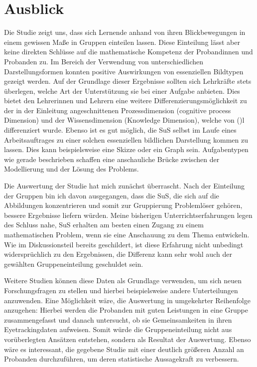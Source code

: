 \chapter{Ausblick}
Die Studie zeigt uns, dass sich Lernende anhand von ihren Blickbewegungen in einem gewissen Maße in Gruppen einteilen lassen. Diese Einteilung lässt aber keine direkten Schlüsse auf die mathematische Kompetenz der Probandinnen und Probanden zu.  Im Bereich der Verwendung von unterschiedlichen Darstellungsformen konnten positive Auswirkungen von essenziellen Bildtypen gezeigt werden.  Auf der Grundlage dieser Ergebnisse sollten sich Lehrkräfte stets überlegen, welche Art der Unterstützung sie bei einer Aufgabe anbieten. Dies bietet den Lehrerinnen und Lehrern eine weitere Differenzierungsmöglichkeit zu der in der Einleitung angeschnittenen Prozessdimension (cognitive process Dimension) und der Wissensdimension (Knowledge Dimension), welche von \citeauthor{anderson2001taxonomy} ()l differenziert wurde. Ebenso ist es gut möglich, die \gls{SuS} selbst im Laufe eines Arbeitsauftrages zu einer solchen essenziellen bildlichen Darstellung kommen zu lassen. Dies kann beispielsweise eine Skizze oder ein Graph sein. Aufgabentypen wie gerade beschrieben schaffen eine anschauliche Brücke zwischen der Modellierung und der Lösung des Problems.


Die Auswertung der Studie hat mich zunächst überrascht. Nach der Einteilung der Gruppen bin ich davon ausgegangen, dass die SuS, die sich auf die Abbildungen konzentrieren und somit zur Gruppierung Problemlöser gehören, bessere Ergebnisse liefern würden. Meine bisherigen Unterrichtserfahrungen legen des Schluss nahe, SuS erhalten am besten einen Zugang zu einem mathematischen Problem, wenn sie eine Anschauung zu dem Thema entwickeln. Wie im Diskussionsteil bereits geschildert, ist diese Erfahrung nicht unbedingt widersprüchlich zu den Ergebnissen, die Differenz kann sehr wohl auch der gewählten Gruppeneinteilung geschuldet sein. 


Weitere Studien können diese Daten als Grundlage verwenden, um sich neuen Forschungsfragen zu stellen und hierbei beispielsweise andere Unterteilungen anzuwenden. Eine Möglichkeit wäre, die Auswertung in umgekehrter Reihenfolge anzugehen: Hierbei werden die Probanden mit guten Leistungen in eine Gruppe zusammengefasst und danach untersucht, ob sie Gemeinsamkeiten in ihren Eyetrackingdaten aufweisen. Somit würde die Gruppeneinteilung nicht aus vorüberlegten Ansätzen entstehen, sondern als Resultat der Auswertung. 
Ebenso wäre es interessant, die gegebene Studie mit einer deutlich größeren Anzahl an Probanden durchzuführen, um deren statistische Aussagekraft zu verbessern.